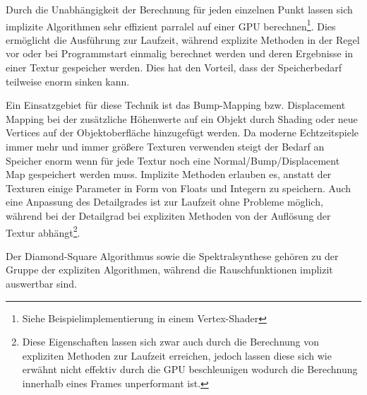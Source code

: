 Durch die Unabhängigkeit der Berechnung für jeden einzelnen Punkt lassen sich implizite Algorithmen sehr effizient parralel auf einer GPU berechnen\footnote{Siehe Beispielimplementierung in einem Vertex-Shader}. Dies ermöglicht die Ausführung zur Laufzeit, während explizite Methoden in der Regel vor oder bei Programmstart einmalig berechnet werden und deren Ergebnisse in einer Textur gespeicher werden.
Dies hat den Vorteil, dass der Speicherbedarf teilweise enorm sinken kann. 

Ein Einsatzgebiet für diese Technik ist das Bump-Mapping bzw. Displacement Mapping bei der zusätzliche Höhenwerte auf ein Objekt durch Shading oder neue Vertices auf der Objektoberfläche hinzugefügt werden\cite{displacementNStuff}. Da moderne Echtzeitspiele immer mehr und immer größere Texturen verwenden steigt der Bedarf an Speicher enorm wenn für jede Textur noch eine Normal/Bump/Displacement Map gespeichert werden muss. Implizite Methoden erlauben es, anstatt der Texturen einige Parameter in Form von Floats und Integern zu speichern.
Auch eine Anpassung des Detailgrades ist zur Laufzeit ohne Probleme möglich, während bei der Detailgrad bei expliziten Methoden von der Auflösung der Textur abhängt\footnote{Diese Eigenschaften lassen sich zwar auch durch die Berechnung von expliziten Methoden zur Laufzeit erreichen, jedoch lassen diese sich wie erwähnt nicht effektiv durch die GPU beschleunigen wodurch die Berechnung innerhalb eines Frames unperformant ist.}.

Der Diamond-Square Algorithmus sowie die Spektralsynthese gehören zu der Gruppe der expliziten Algorithmen, während die Rauschfunktionen implizit auswertbar sind.